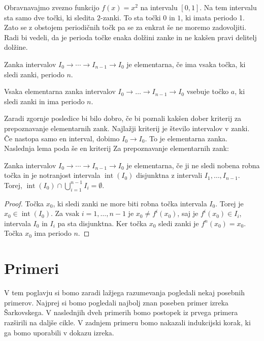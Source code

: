 \documentclass[mat2]{fmfdelo}
\DeclareMathOperator{\interior}{int}
\begin{document}
Obravnavajmo zvezno funkcijo $f(x) = x^2$ na intervalu $[0, 1]$. Na tem intervalu sta samo dve točki, ki sledita $2$-zanki. To sta točki $0$ in $1$, ki imata periodo 1.
Zato se z obstojem periodičnih točk pa se za enkrat še ne moremo zadovoljiti. Radi bi vedeli, da je perioda točke enaka dolžini zanke in ne kakšen pravi delitelj dolžine.

\begin{definicija}\label{def:element}
Zanka intervalov $I_0 \to \cdots \to I_{n-1} \to I_0$ je elementarna, če ima vsaka točka, ki sledi zanki, periodo $n$.
\end{definicija}

\begin{posledica}
Vsaka elementarna zanka intervalov $I_0 \to \dots \to I_{n-1} \to I_0$ vsebuje točko $a$, ki sledi zanki in ima periodo $n$.
\end{posledica}

Zaradi zgornje posledice bi bilo dobro, če bi poznali kakšen dober kriterij za prepoznavanje elementarnih zank. Najlažji kriterij je število intervalov v zanki. Če nastopa samo en interval, dobimo $I_0 \to I_0$. To je elementarna zanka. Naslednja lema poda še en kriterij Za prepoznavanje elementarnih zank:

\begin{lema}\label{lem:element}
Zanka intervalov $I_0 \to \cdots \to I_{n-1} \to I_0$ je elementarna, če ji ne sledi nobena robna točka in je notranjost intervala $\interior(I_0)$ disjunktna z intervali $I_1, \dots, I_{n-1}$. Torej, $\interior(I_0) \cap \bigcup_{i=1}^{n-1}I_i = \emptyset$.
\end{lema}
\begin{proof}
Točka $x_0$, ki sledi zanki ne more biti robna točka intervala $I_0$. Torej je $x_0 \in \interior(I_0)$. Za vsak $i=1, \dots, n-1$ je $x_0 \neq f^i(x_0)$, saj je $f^i(x_0) \in I_i$, intervala $I_0$ in $I_i$ pa sta disjunktna. Ker točka $x_0$ sledi zanki je $f^n(x_0)=x_0$. Točka $x_0$ ima periodo $n$.
\end{proof}

\section{Primeri}%
V tem poglavju si bomo zaradi lažjega razumevanja pogledali nekaj posebnih primerov. Najprej si bomo pogledali najbolj znan poseben primer izreka Šarkovskega. V naslednjih dveh primerih bomo postopek iz prvega primera razširili na daljše cikle. V zadnjem primeru bomo nakazali indukcijski korak, ki ga bomo uporabili v dokazu izreka.
\end{document}
